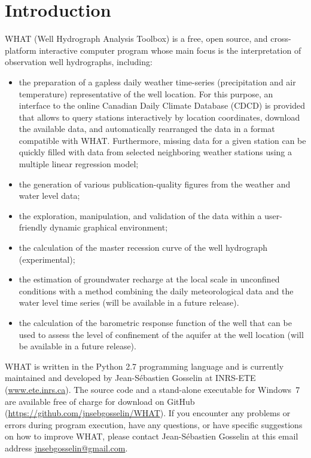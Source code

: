 \documentclass[12pt, letterpaper, fleqn]{report}
\begin{document}
\newpage

\chapter*{Introduction}

WHAT (Well Hydrograph Analysis Toolbox) is a free, open source, and cross-platform interactive computer program whose main focus is the interpretation of observation well hydrographs, including:

\begin{itemize}

\item{the preparation of a gapless daily weather time-series (precipitation and air temperature) representative of the well location. For this purpose, an interface to the online Canadian Daily Climate Database (CDCD) is provided that allows to query stations interactively by location coordinates, download the available data, and automatically rearranged the data in a format compatible with WHAT. Furthermore, missing data for a given station can be quickly filled with data from selected neighboring weather stations using a multiple linear regression model;}

\item{the generation of various publication-quality figures from the weather and water level data;}

\item{the exploration, manipulation, and validation of the data within a user-friendly dynamic graphical environment;}

\item{the calculation of the master recession curve of the well hydrograph (experimental);}

\item{the estimation of groundwater recharge at the local scale in unconfined conditions with a method combining the daily meteorological data and the water level time series (will be available in a future release).}

\item{the calculation of the barometric response function of the well that can be used to assess the level of confinement of the aquifer at the well location (will be available in a future release).}

\end{itemize}

WHAT is written in the Python 2.7 programming language and is currently maintained and developed by Jean-S\'ebastien Gosselin at INRS-ETE (\url{www.ete.inrs.ca}). The source code and a stand-alone executable for Windows 7 are available free of charge for download on GitHub (\url{https://github.com/jnsebgosselin/WHAT}). If you encounter any problems or errors during program execution, have any questions, or have specific suggestions on how to improve WHAT, please contact Jean-S\'ebastien Gosselin at this email address \href{mailto:jnsebgosselin@gmail.com}{jnsebgosselin@gmail.com}.
\end{document}
